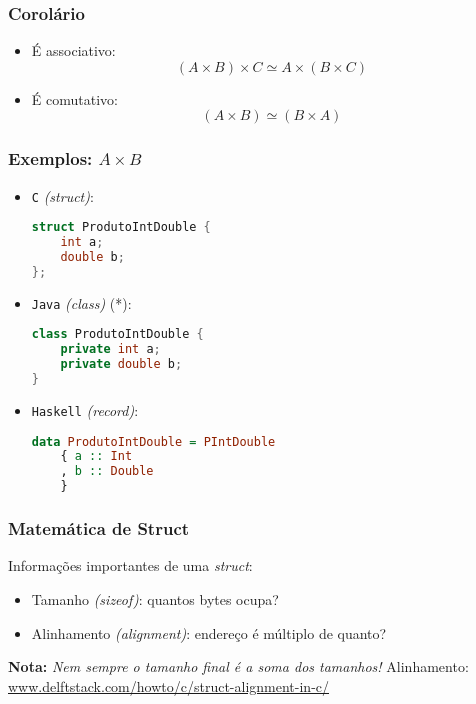 \documentclass{beamer}
\newcommand{\lang}[1]{\texttt{#1}}
\newcommand{\nota}[1]{\textbf{Nota:}\textit{ #1}}
\newcommand{\typesim}{\simeq}
\begin{document}
\begin{frame}
    \frametitle{Corolário}
    \begin{itemize}
        \item É associativo:
            \[
                (A \times B) \times C \typesim A \times (B \times C)
            \]
        \item É comutativo:
            \[
                (A \times B) \typesim (B \times A)
            \]
    \end{itemize}
\end{frame}

\begin{frame}[fragile]
    \frametitle{Exemplos: \(A \times B\)}
    \begin{itemize}
        \item \lang{C} \emph{(struct)}:
            \begin{lstlisting}[language=C]
struct ProdutoIntDouble {
    int a;
    double b;
};
            \end{lstlisting}
        \item \lang{Java} \emph{(class)} (*):
            \begin{lstlisting}[language=Java]
class ProdutoIntDouble {
    private int a;
    private double b;
}
            \end{lstlisting}
        \item \lang{Haskell} \emph{(record)}:
            \begin{lstlisting}[language=Haskell]
data ProdutoIntDouble = PIntDouble
    { a :: Int
    , b :: Double
    }
            \end{lstlisting}
    \end{itemize}
\end{frame}

\begin{frame}
    \frametitle{Matemática de Struct}
    Informações importantes de uma \emph{struct}:
    \begin{itemize}
        \item Tamanho \emph{(sizeof)}:
            quantos bytes ocupa?
        \item Alinhamento \emph{(alignment)}:
            endereço é múltiplo de quanto?
    \end{itemize}
    \vfill
    \nota{Nem sempre o \emph{tamanho final}
        é a soma dos \emph{tamanhos}!}
    \vfill
    Alinhamento:
    \url{www.delftstack.com/howto/c/struct-alignment-in-c/}
\end{frame}
\end{document}
